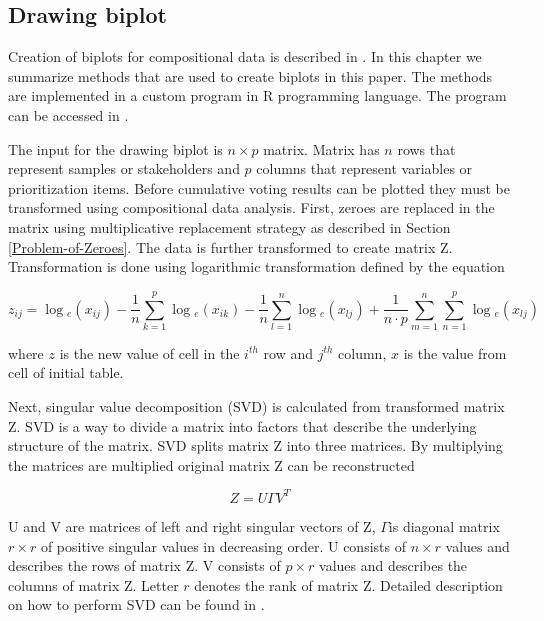 \subsection{Drawing biplot}

Creation of biplots for compositional data is described in \citep{Aitchison2002}.
In this chapter we summarize methods that are used to create biplots
in this paper. The methods are implemented in a custom program in
R programming language. The program can be accessed in .

The input for the drawing biplot is $n\times p$ matrix. Matrix has
$n$ rows that represent samples or stakeholders and $p$ columns
that represent variables or prioritization items. Before cumulative
voting results can be plotted they must be transformed using compositional
data analysis. First, zeroes are replaced in the matrix using multiplicative
replacement strategy as described in Section \ref{Problem-of-Zeroes}.
The data is further transformed to create matrix Z. Transformation
is done using logarithmic transformation defined by the equation

\begin{equation}
z_{ij}=\log{}_{e}(x_{ij})-\frac{1}{n}\sum_{k=1}^{p}\log{}_{e}(x_{ik})-\frac{1}{n}\sum_{l=1}^{n}\log{}_{e}(x_{lj})+\frac{1}{n\cdot p}\sum_{m=1}^{n}\sum_{n=1}^{p}\log{}_{e}(x_{lj})\label{eq:biplot}
\end{equation}

where $z$ is the new value of cell in the $i^{th}$ row and $j^{th}$
column, $x$ is the value from cell of initial table.

Next, singular value decomposition (SVD) is calculated from transformed
matrix Z. SVD is a way to divide a matrix into factors that describe
the underlying structure of the matrix. SVD splits matrix Z into three
matrices. By multiplying the matrices are multiplied original matrix
Z can be reconstructed

\begin{equation}
Z=U\Gamma V^{T}\label{eq:SVD}
\end{equation}

U and V are matrices of left and right singular vectors of Z, $\Gamma$is
diagonal matrix $r\times r$ of positive singular values in decreasing
order. U consists of $n\times r$ values and describes the rows of
matrix Z. V consists of $p\times r$ values and describes the columns
of matrix Z. Letter $r$ denotes the rank of matrix Z. Detailed description
on how to perform SVD can be found in \citep{Golub1970}.

